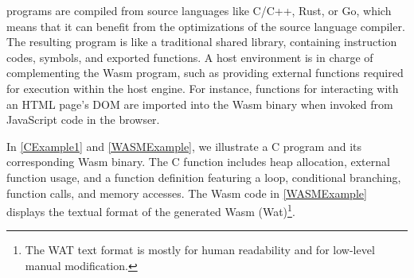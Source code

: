 

\Wasm programs are compiled from source languages like C/C++, Rust, or Go, which means that it can benefit from the optimizations of the source language compiler.
The resulting \wasm program is like a traditional shared library, containing instruction codes, symbols, and exported functions. 
A host environment is in charge of complementing the Wasm program, such as providing external functions required for execution within the host engine. 
For instance, functions for interacting with an HTML page's DOM are imported into the Wasm binary when invoked from JavaScript code in the browser. 


In \autoref{CExample1} and \autoref{WASMExample}, we illustrate a C program and its corresponding Wasm binary. 
The C function includes heap allocation, external function usage, and a function definition featuring a loop, conditional branching, function calls, and memory accesses. 
The Wasm code in \autoref{WASMExample} displays the textual format of the generated Wasm (Wat)\footnote{The WAT text format is mostly for human readability and for low-level manual modification.}.



\begin{minipage}[hbtp]{0.9\textwidth}
    \begin{minipage}[t]{1.0\linewidth}
    
    \end{minipage}
\end{minipage}





\label{background:wasm:binary}

